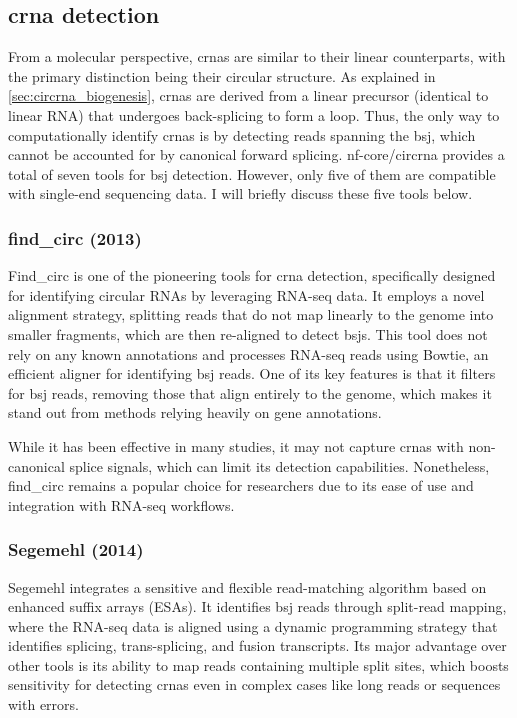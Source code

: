 \subsection{\gls{crna} detection}
\label{subsec:circrna_detection}
From a molecular perspective, \gls{crna}s are similar to their linear
counterparts, with the primary distinction being their circular structure.
As explained in \cref{sec:circrna_biogenesis}, \gls{crna}s are derived from a
linear precursor (identical to linear RNA) that undergoes back-splicing to form
a loop.
Thus, the only way to computationally identify \gls{crna}s is by detecting
reads spanning the \gls{bsj}, which cannot be accounted for by canonical
forward splicing.
nf-core/circrna provides a total of seven tools for \gls{bsj}
detection. However, only five of them are compatible with single-end sequencing
data. I will briefly discuss these five tools below.

\subsubsection{find\_circ (2013)\supercite{memczak_circular_2013}}
Find\_circ is one of the pioneering tools for \gls{crna} detection,
specifically designed for identifying circular RNAs by leveraging RNA-seq data.
It employs a novel alignment strategy, splitting reads that do not map linearly
to the genome into smaller fragments, which are then re-aligned to detect
\gls{bsj}s\supercite{memczak_circular_2013}.
This tool does not rely on any known annotations and processes RNA-seq reads
using Bowtie, an efficient aligner for identifying \gls{bsj} reads.
One of its key features is that it filters for \gls{bsj} reads, removing those
that align entirely to the genome, which makes it stand out from methods
relying heavily on gene annotations\supercite{memczak_circular_2013}.

While it has been effective in many studies, it may not capture \gls{crna}s
with non-canonical splice signals, which can limit its detection
capabilities\supercite{sekar_circular_2018,liu_prkra_2022}.
Nonetheless, find\_circ remains a popular choice for researchers due to its
ease of use and integration with RNA-seq workflows.

\subsubsection{Segemehl (2014)\supercite{hoffmann_multi-split_2014}}
Segemehl integrates a sensitive and flexible read-matching algorithm based on
enhanced suffix arrays (ESAs).
It identifies \gls{bsj} reads through split-read mapping, where the RNA-seq
data is aligned using a dynamic programming strategy that identifies splicing,
trans-splicing, and fusion transcripts.
Its major advantage over other tools is its ability to map reads containing
multiple split sites, which boosts sensitivity for detecting \gls{crna}s even
in complex cases like long reads or sequences with
errors\supercite{hoffmann_multi-split_2014}.

